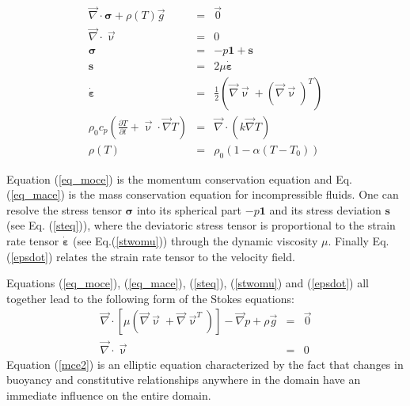 \begin{eqnarray}
{\vec \nabla}\cdot {\bm \sigma} + \rho(T) {\vec g} &=& {\vec 0} \label{eq_moce}\\
{\vec \nabla}\cdot {\vec \upnu} &=& 0 \label{eq_mace}\\
{\bm \sigma} &=& -p {\bm 1} + {\bm s} \label{steq}\\
{\bm s} &=& 2 \mu \dot{\bm \varepsilon} \label{stwomu}\\
\dot{\bm \varepsilon}  &=& \frac{1}{2} \left( {\vec \nabla}{\vec \upnu} 
+ ({\vec \nabla}{\vec \upnu})^T  \right) \label{epsdot} \\
\rho_0 c_p \left( \frac{\partial T}{\partial t}  + {\vec \upnu}\cdot {\vec \nabla} T\right) 
&=& {\vec \nabla}\cdot (k {\vec \nabla}T)  \label{eqhte} \\
\rho(T) &=& \rho_0 (1 - \alpha (T-T_0)) 
\end{eqnarray}

Equation (\ref{eq_moce}) is the momentum conservation equation and 
Eq. (\ref{eq_mace}) is the mass conservation equation for incompressible fluids.
One can resolve the stress tensor ${\bm \sigma}$ into its spherical part $-p{\bm 1}$ and its stress deviation ${\bm s}$ (see Eq. (\ref{steq})), where the deviatoric stress tensor is proportional to the strain rate tensor $\dot{\bm \varepsilon}$ (see Eq.(\ref{stwomu})) through the dynamic viscosity $\mu$. Finally Eq. (\ref{epsdot}) relates the strain rate tensor to the velocity field.

Equations (\ref{eq_moce}), (\ref{eq_mace}), (\ref{steq}), (\ref{stwomu}) and (\ref{epsdot}) all together lead to the following form of the Stokes equations:
\begin{eqnarray}
{\vec \nabla}\cdot [\mu ({\vec\nabla} {\vec \upnu} + {\vec \nabla} {\vec \upnu}^T ) ] 
- {\vec \nabla}p + \rho {\vec g} &=& {\vec 0} \label{mce2} \\
{\vec \nabla}\cdot {\vec \upnu} &=& 0 \label{eq_mace2}
\end{eqnarray}
Equation (\ref{mce2}) is an elliptic equation characterized by the 
fact that changes in buoyancy and constitutive relationships anywhere in the domain have an immediate influence on the entire domain.

